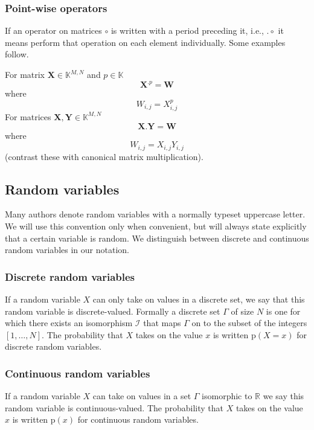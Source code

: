 \subsubsection{Point-wise operators}

If an operator on matrices $\circ$ is written with a period preceding it, i.e.,
$.\circ$ it
means perform that operation on each element individually. Some examples follow.

For matrix $\boldsymbol{X} \in \mathbb{K}^{M,N}$ and $p \in \mathbb{K}$
\[
    \boldsymbol{X}^{.p} = \boldsymbol{W}
\] where
\[
    W_{i,j}=X_{i,j}^{p}
\]
For matrices $\boldsymbol{X},\boldsymbol{Y} \in \mathbb{K}^{M,N}$
\[
    \boldsymbol{X}.\boldsymbol{Y} = \boldsymbol{W}
\] where
\[
    W_{i,j}=X_{i,j}Y_{i,j}
\]
(contrast these with canonical matrix multiplication).

\subsection{Random variables}

Many authors denote random variables with a normally typeset uppercase letter.
We will use this convention only when convenient, but will always state
explicitly that a certain variable is random. We distinguish between discrete and
continuous random variables in our notation.

\subsubsection{Discrete random variables}

If a random variable $X$ can only take on values in a discrete set, we say that this
random variable is discrete-valued. Formally a discrete set $\Gamma$ of size $N$
is one for which there exists an isomorphism $\mathscr{I}$ that maps $\Gamma$ on
to the subset of the integers $[1, \dotsc, N]$. The probability that $X$ takes on
the value $x$ is written $\mathrm{p}(X=x)$ for discrete random variables.

\subsubsection{Continuous random variables}

If a random variable $X$ can take on values in a set $\Gamma$ isomorphic to
$\mathbb{R}$ we say this random variable is continuous-valued. The probability
that $X$ takes on the value $x$ is written $\mathrm{p}(x)$ for continuous random
variables.

